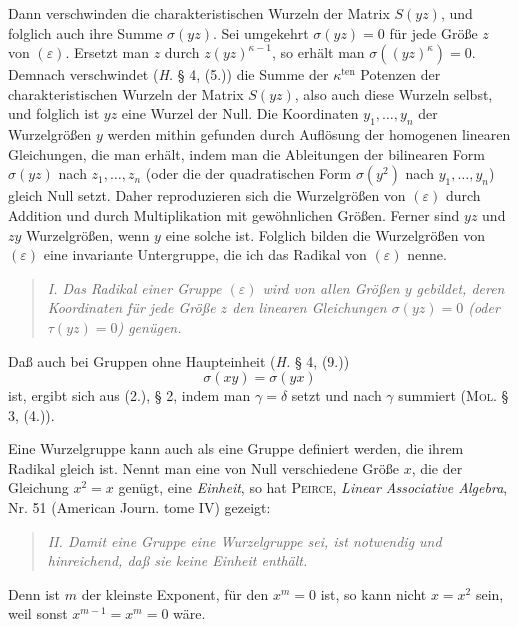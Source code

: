 \documentclass[11pt]{article}
\newcommand{\eps}{\varepsilon}
\newcommand{\ten}{\mathrm{ten}}
\begin{document}
Dann verschwinden die charakteristischen Wurzeln der Matrix $S(yz)$, und folglich auch ihre Summe $\sigma(yz)$. Sei umgekehrt $\sigma(yz)=0$ für jede Größe $z$ von $(\eps)$. Ersetzt man $z$ durch $z(yz)^{\kappa-1}$, so erhält man $\sigma((yz)^\kappa)=0$. Demnach verschwindet (\emph{H.} § 4, (5.)) die Summe der $\kappa^{\ten}$ Potenzen der charakteristischen Wurzeln der Matrix $S(yz)$, also auch diese Wurzeln selbst, und folglich ist $yz$ eine Wurzel der Null. Die Koordinaten $y_1,\ldots,y_n$ der Wurzelgrößen $y$ werden mithin gefunden durch Auflösung der homogenen linearen Gleichungen, die man erhält, indem man die Ableitungen der bilinearen Form $\sigma(yz)$ nach $z_1,\ldots,z_n$ (oder die der quadratischen Form $\sigma(y^2)$ nach $y_1,\ldots,y_n$) gleich Null setzt. Daher reproduzieren sich die Wurzelgrößen von $(\eps)$ durch Addition und durch Multiplikation mit gewöhnlichen Größen. Ferner sind $yz$ und $zy$ Wurzelgrößen, wenn $y$ eine solche ist. Folglich bilden die Wurzelgrößen von $(\eps)$ eine invariante Untergruppe, die ich das Radikal von $(\eps)$ nenne.

\begin{quote}\itshape
I. Das Radikal einer Gruppe $(\eps)$ wird von allen Größen $y$ gebildet, deren Koordinaten für jede Größe $z$ den linearen Gleichungen $\sigma(yz)=0$ (oder $\tau(yz)=0$) genügen.
\end{quote}

Daß auch bei Gruppen ohne Haupteinheit (\emph{H.} § 4, (9.))
\begin{equation}\tag{2.}
 \sigma(xy)=\sigma(yx)
\end{equation}
ist, ergibt sich aus (2.), § 2, indem man $\gamma=\delta$ setzt und nach $\gamma$ summiert (\textsc{Mol}. § 3, (4.)).

Eine Wurzelgruppe kann auch als eine Gruppe definiert werden, die ihrem Radikal gleich ist. Nennt man eine von Null verschiedene Größe $x$, die der Gleichung $x^2=x$ genügt, eine \emph{Einheit}, so hat \textsc{Peirce}, \emph{Linear Associative Algebra}, Nr. 51 (American Journ. tome IV) gezeigt:

\begin{quote}\itshape
II. Damit eine Gruppe eine Wurzelgruppe sei, ist notwendig und hinreichend, daß sie keine Einheit enthält.
\end{quote}

Denn ist $m$ der kleinste Exponent, für den $x^m=0$ ist, so kann nicht $x=x^2$ sein, weil sonst $x^{m-1}=x^m=0$ wäre.
\end{document}
